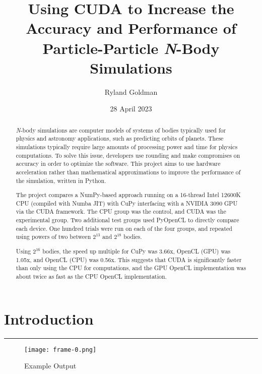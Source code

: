 \documentclass[12pt, letterpaper]{article}
\title{Using CUDA to Increase the Accuracy and Performance of 
Particle-Particle \textit{N}-Body Simulations}
\author{Ryland Goldman}
\date{28 April 2023}
\begin{document}
\maketitle

\begin{abstract}
\textit{N}-body simulations are computer models of systems of bodies 
typically used for physics and astronomy applications, such as predicting 
orbits of planets. These simulations typically require large amounts of 
processing power and time for physics computations. To solve this issue, 
developers use rounding and make compromises on accuracy in order to 
optimize the software. This project aims to use hardware acceleration 
rather than mathematical approximations to improve the performance of the 
simulation, written in Python.

The project compares a NumPy-based approach running on a 16-thread Intel 
12600K CPU (compiled with Numba JIT) with CuPy interfacing with a NVIDIA 
3090 GPU via the CUDA framework. The CPU group was the control, and CUDA 
was the experimental group. Two additional test groups used PyOpenCL to 
directly compare each device. One hundred trials were run on each of the 
four groups, and repeated using powers of two between 
\begin{math}2^{13}\end{math} and \begin{math}2^{18}\end{math} bodies.

Using \begin{math}2^{16}\end{math} bodies, the speed up multiple for CuPy 
was 3.66x, OpenCL (GPU) was 1.05x, and OpenCL (CPU) was 0.56x. This 
suggests that CUDA is significantly faster than only using the CPU for 
computations, and the GPU OpenCL implementation was about twice as fast as 
the CPU OpenCL implementation.

\end{abstract}
\clearpage

\section{Introduction}
\vspace{1pt}\hrule\vspace{12pt}

\begin{figure}[H]
\texttt{[image: frame-0.png]}
\centering
\label{fig:exampleout}
\caption{Example Output}
\end{figure}
\end{document}
